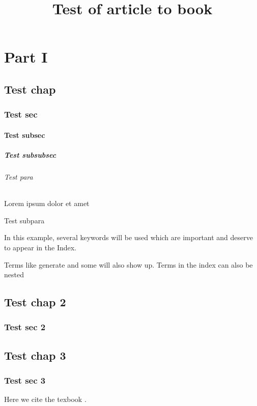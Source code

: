 \documentclass[]{examx}
\title{Test of article to book}
\begin{document}
    \frontmatter
    \maketitle
    \tableofcontents
    \listoffigures
    \listoftables
    
    \part{Part I}
    \chapter{Test chap}
    \section{Test sec}
    \subsection{Test subsec}
    \subsubsection{Test subsubsec}
    \paragraph{Test para} Lorem ipsum dolor et amet
    \subparagraph{Test subpara}
    In this example, several keywords will be used 
    which are important and deserve to appear in the Index.
    
    Terms like generate and some will also 
    show up. Terms in the index can also be nested 
    
    \chapter{Test chap 2}
    \section{Test sec 2}

    \mainmatter
    \chapter{Test chap 3}
    \section{Test sec 3}
    Here we cite the texbook \cite{texbook}.
    
\end{document}
